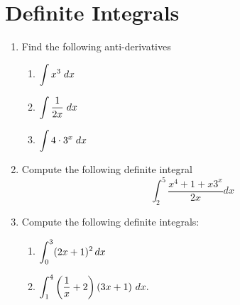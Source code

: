 \documentclass[10pt]{article}
\begin{document}
\section{Definite Integrals}
\begin{enumerate}
    \item Find the following anti-derivatives 
    \begin{enumerate}
        \item $\displaystyle \int x^3 \;dx$
        \item $\displaystyle \int \frac{1}{2x} \;dx$
        \item $\displaystyle  \int 4\cdot3^x\;dx$
    \end{enumerate}
    \item Compute the following definite integral
    \[\int_2^5 \frac{x^4+1 + x3^x}{2x}dx\]
    \item Compute the following definite integrals:
    \begin{enumerate}
        \item $\displaystyle \int_0^3 (2x+1)^2\,dx$
         \item $\displaystyle \int_1^4 \left(\frac 1x + 2\right)\left(3x + 1\right)\,dx.$
    \end{enumerate}    

\end{enumerate}

\newpage
\end{document}
